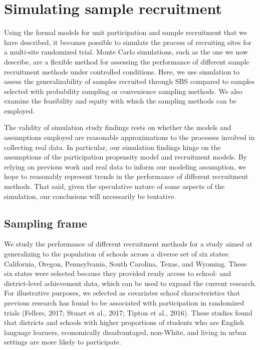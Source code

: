 \documentclass[
  man,floatsintext]{apa6}
\begin{document}
\hypertarget{simulating-sample-recruitment}{%
\section*{Simulating sample recruitment}\label{simulating-sample-recruitment}}

Using the formal models for unit participation and sample recruitment that we have described, it becomes possible to simulate the process of recruiting sites for a multi-site randomized trial.
Monte Carlo simulations, such as the one we now describe, are a flexible method for assessing the performance of different sample recruitment methods under controlled conditions.
Here, we use simulation to assess the generalizability of samples recruited through SBS compared to samples selected with probability sampling or convenience sampling methods. We also examine the feasibility and equity with which the sampling methods can be employed.

The validity of simulation study findings rests on whether the models and assumptions employed are reasonable approximations to the processes involved in collecting real data. In particular, our simulation findings hinge on the assumptions of the participation propensity model and recruitment models. By relying on previous work and real data to inform our modeling assumption, we hope to reasonably represent trends in the performance of different recruitment methods. That said, given the speculative nature of some aspects of the simulation, our conclusions will necessarily be tentative.

\hypertarget{sampling-frame}{%
\subsection*{Sampling frame}\label{sampling-frame}}

We study the performance of different recruitment methods for a study aimed at generalizing to the population of schools across a diverse set of six states: California, Oregon, Pennsylvania, South Carolina, Texas, and Wyoming. These six states were selected because they provided ready access to school- and district-level achievement data, which can be used to expand the current research.
For illustrative purposes, we selected as covariates school characteristics that previous research has found to be associated with participation in randomized trials (Fellers, 2017; Stuart et al., 2017; Tipton et al., 2016). These studies found that districts and schools with higher proportions of students who are English language learners, economically disadvantaged, non-White, and living in urban settings are more likely to participate.
\end{document}
